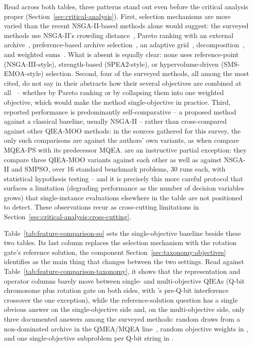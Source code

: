 Read across both tables, three patterns stand out even before the
critical analysis proper (Section~\ref{sec:critical-analysis}). First,
selection mechanisms are more varied than the recent NSGA-II-based
methods alone would suggest: the surveyed methods use NSGA-II's crowding
distance~\citep{guzel2022qnsga2,olvera2023continuous,kumar2026eahqnsga2},
Pareto ranking with an external archive~\citep{kim2006qmea}, preference-based
archive selection~\citep{kim2011mqeaps}, an adaptive
grid~\citep{zhang2012moqeavrp}, decomposition~\citep{deng2024moqead},
and weighted sums~\citep{li2007hqga}. What is absent is equally clear:
none uses reference-point (NSGA-III-style), strength-based
(SPEA2-style), or hypervolume-driven (SMS-EMOA-style) selection. Second,
four of the surveyed methods, all among the most cited, do not say in their
abstracts how their several objectives are combined at
all~\citep{wang2014powertrain,mousavi2019uav,deng2020gate,hussain2022moqiga}
-- whether by Pareto ranking or by collapsing them into one weighted
objective, which would make the method single-objective in practice.
Third, reported performance is predominantly self-comparative -- a
proposed method against a classical baseline, usually NSGA-II -- rather
than cross-compared against other QIEA-MOO methods: in the sources
gathered for this survey, the only such comparisons are against the
authors' own variants, as when \citet{kim2011mqeaps} compare MQEA-PS
with its predecessor MQEA. \citet{olvera2023continuous} are an
instructive partial exception: they compare three QIEA-MOO variants
against each other as well as against NSGA-II and SMPSO, over 16
standard benchmark problems, 30 runs each, with statistical hypothesis
testing -- and it is precisely this more careful protocol that surfaces
a limitation (degrading performance as the number of decision variables
grows) that single-instance evaluations elsewhere in the table are not
positioned to detect. These observations recur as cross-cutting
limitations in Section~\ref{sec:critical-analysis:cross-cutting}.

Table~\ref{tab:feature-comparison-so} sets the single-objective
baseline beside these two tables. Its last column replaces the
selection mechanism with the rotation gate's reference solution, the
component Section~\ref{sec:taxonomy:objectives} identifies as the main
thing that changes between the two settings. Read against
Table~\ref{tab:feature-comparison-taxonomy}, it shows that the
representation and operator columns barely move between single- and
multi-objective QIEAs (Q-bit chromosome plus rotation gate on both
sides, with \citet{narayanan1996qiga}'s pre-Q-bit interference
crossover the one exception), while the reference-solution question
has a single obvious answer on the single-objective side and, on the
multi-objective side, only three documented answers among the surveyed
methods: random draws from a non-dominated archive in the QMEA/MQEA
line~\citep{kim2009mqea,ryu2014dmqea}, random objective weights in
\citet{li2007hqga}, and one single-objective subproblem per Q-bit string
in \citet{deng2024moqead}.

